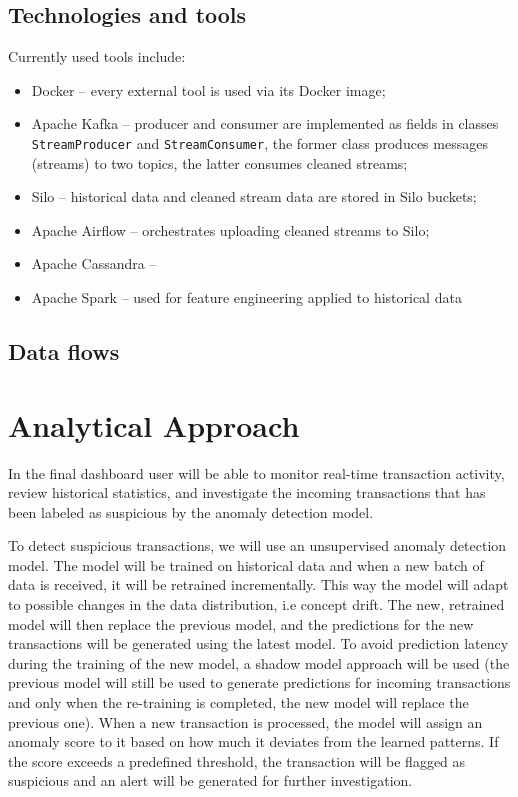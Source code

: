 \documentclass[titlepage]{article}
\begin{document}
\subsection{Technologies and tools}
Currently used tools include:
\begin{itemize}
    \item Docker -- every external tool is used via its Docker image;
    \item Apache Kafka -- producer and consumer are implemented as fields in classes \texttt{StreamProducer} and \texttt{StreamConsumer}, the former class produces messages (streams) to two topics, the latter consumes cleaned streams;
    \item Silo -- historical data and cleaned stream data are stored in Silo buckets;
    \item Apache Airflow -- orchestrates uploading cleaned streams to Silo;
    \item Apache Cassandra -- 
    \item Apache Spark -- used for feature engineering applied to historical data 
\end{itemize}
\subsection{Data flows}


\section{Analytical Approach}
In the final dashboard user will be able to monitor real-time transaction activity, review historical statistics, and investigate the incoming transactions that has been labeled as suspicious by the anomaly detection model. 

To detect suspicious transactions, we will use an unsupervised anomaly detection model. The model will be trained on historical data and when a new batch of data is received, it will be retrained incrementally. This way the model will adapt to possible changes in the data distribution, i.e concept drift. The new, retrained model will then replace the previous model, and the predictions for the new transactions will be generated using the latest model. 
To avoid prediction latency during the training of the new model, a shadow model approach will be used (the previous model will still be used to generate predictions for incoming transactions and only when the re-training is completed, the new model will replace the previous one).
When a new transaction is processed, the model will assign an anomaly score to it based on how much it deviates from the learned patterns. If the score exceeds a predefined threshold, the transaction will be flagged as suspicious and an alert will be generated for further investigation. 
\end{document}
